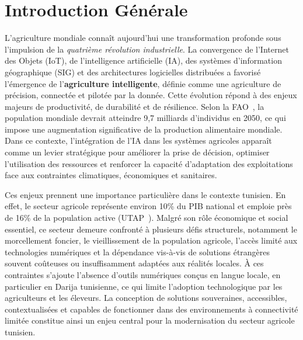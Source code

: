 
\cleardoublepage

\chapter*{Introduction Générale}

L'agriculture mondiale connaît aujourd'hui une transformation profonde sous
l'impulsion de la \textit{quatrième révolution industrielle}. La convergence de
l'Internet des Objets (IoT), de l'intelligence artificielle (IA), des systèmes
d'information géographique (SIG) et des architectures logicielles distribuées a
favorisé l'émergence de l'\textbf{agriculture intelligente}, définie comme une agriculture de
précision, connectée et pilotée par la donnée. Cette évolution répond à des
enjeux majeurs de productivité, de durabilité et de résilience. Selon la
FAO~\cite{fao2023}, la population mondiale devrait atteindre 9,7 milliards
d'individus en 2050, ce qui impose une augmentation significative de la
production alimentaire mondiale. Dans ce contexte, l'intégration de l'IA dans
les systèmes agricoles apparaît comme un levier stratégique pour améliorer la
prise de décision, optimiser l'utilisation des ressources et renforcer la
capacité d'adaptation des exploitations face aux contraintes climatiques,
économiques et sanitaires.

Ces enjeux prennent une importance particulière dans le contexte tunisien. En
effet, le secteur agricole représente environ 10\% du PIB national et emploie
près de 16\% de la population active (UTAP~\cite{utap2023}). Malgré son rôle
économique et social essentiel, ce secteur demeure confronté à plusieurs défis
structurels, notamment le morcellement foncier, le vieillissement de la
population agricole, l'accès limité aux technologies numériques et la dépendance
vis-à-vis de solutions étrangères souvent coûteuses ou insuffisamment adaptées
aux réalités locales. À ces contraintes s'ajoute l'absence d'outils numériques
conçus en langue locale, en particulier en Darija tunisienne, ce qui limite
l'adoption technologique par les agriculteurs et les éleveurs. La conception de
solutions souveraines, accessibles, contextualisées et capables de fonctionner
dans des environnements à connectivité limitée constitue ainsi un enjeu central
pour la modernisation du secteur agricole tunisien.


